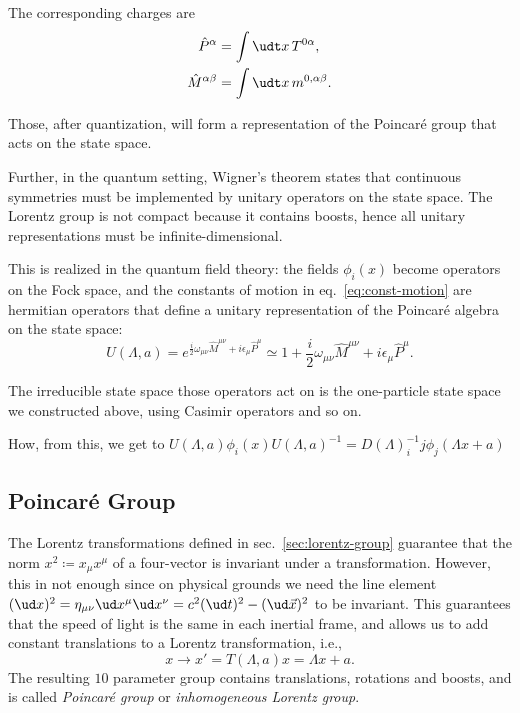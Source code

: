 The corresponding charges are
\begin{subequations}\label{eq:const-motion}
\begin{align}
    \hat{P}^\alpha &= \int \udt x \, T^{0\alpha} , \\
   \hat{M}^{\alpha\beta} &= \int \udt x \, m^{0 ,\alpha\beta} .
\end{align}
\end{subequations}

Those, after quantization, will form a representation of the Poincaré group that acts on the state space.

Further, in the quantum setting, Wigner's theorem states that continuous symmetries must be implemented by unitary operators on the state space. The Lorentz group is not compact because it contains boosts, hence all unitary representations must be infinite-dimensional. 

This is realized in the quantum field theory: the fields $\phi_i(x)$ become operators on the Fock space, and the constants of motion in eq.~\eqref{eq:const-motion} are hermitian operators that define a unitary representation of the Poincaré algebra on the state space:
\begin{equation}
    U(\Lambda,a) = e^{\frac{i}{2} \omega_{\mu\nu} \hat{M}^{\mu\nu} + i \epsilon_\mu \hat{P}^\mu} \simeq 1 + \frac{i}{2} \omega_{\mu\nu} \hat{M}^{\mu\nu} + i \epsilon_\mu \hat{P}^\mu .
\end{equation}

The irreducible state space those operators act on is the one-particle state space we constructed above, using Casimir operators and so on.

\color{red} How, from this, we get to $U(\Lambda,a) \phi_i(x) U(\Lambda,a)^{-1} = D(\Lambda)^{-1}_ij \phi_j (\Lambda x + a)$
\color{black}




\subsection{Poincaré Group}
The Lorentz transformations defined in sec.~\ref{sec:lorentz-group} guarantee that the norm $x^2 \coloneq x_\mu x^\mu$ of a four-vector is invariant under a transformation. However, this in not enough since on physical grounds we need the line element $(\ud x)^2 = \eta_{\mu\nu} \ud x^\mu \ud x^\nu = c^2 (\ud t)^2 - (\ud \vec{x})^2$ to be invariant. This guarantees that the speed of light is the same in each inertial frame, and allows us to add constant translations to a Lorentz transformation, i.e.,
\begin{equation}
    x \to x' = T(\Lambda, a) x = \Lambda x + a .
\end{equation}
The resulting $10$ parameter group contains translations, rotations and boosts, and is called \emph{Poincaré group} or \emph{inhomogeneous Lorentz group}.

